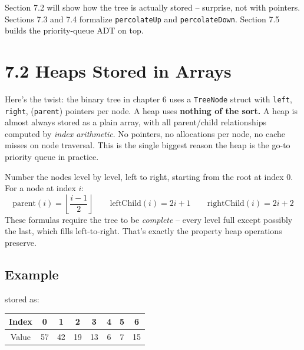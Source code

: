 \documentclass[11pt]{article}
\begin{document}
Section 7.2 will show how the tree is actually stored -- surprise, not with pointers. Sections 7.3 and 7.4 formalize \texttt{percolateUp} and \texttt{percolateDown}. Section 7.5 builds the priority-queue ADT on top.

\section{7.2 Heaps Stored in Arrays}

Here's the twist: the binary tree in chapter 6 uses a \texttt{TreeNode} struct with \texttt{left}, \texttt{right}, (\texttt{parent}) pointers per node. A heap uses \textbf{nothing of the sort.} A heap is almost always stored as a plain array, with all parent/child relationships computed by \emph{index arithmetic}. No pointers, no allocations per node, no cache misses on node traversal. This is the single biggest reason the heap is the go-to priority queue in practice.

\begin{defnbox}
Number the nodes level by level, left to right, starting from the root at index 0. For a node at index $i$:
\[
\text{parent}(i) = \left\lfloor \frac{i-1}{2} \right\rfloor
\qquad
\text{leftChild}(i) = 2i + 1
\qquad
\text{rightChild}(i) = 2i + 2
\]
These formulas require the tree to be \emph{complete} -- every level full except possibly the last, which fills left-to-right. That's exactly the property heap operations preserve.
\end{defnbox}

\subsection*{Example}

\begin{center}
\end{center}

stored as:
\begin{center}
\begin{tabular}{|c|c|c|c|c|c|c|c|}
\hline
Index & 0 & 1 & 2 & 3 & 4 & 5 & 6 \\
\hline
Value & 57 & 42 & 19 & 13 & 6 & 7 & 15 \\
\hline
\end{tabular}
\end{center}
\end{document}
